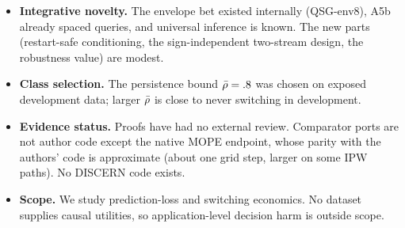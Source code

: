 \begin{itemize}
  inequality. The rate bound holds for the per-step relaxation only; a lower bound for the stationary
  class, which universal inference can beat, is missing.
  \item \textbf{Integrative novelty.} The envelope bet existed internally (QSG-env8), A5b already
  spaced queries, and universal inference is known. The new parts (restart-safe conditioning, the
  sign-independent two-stream design, the robustness value) are modest.
  \item \textbf{Class selection.} The persistence bound $\bar\rho=.8$ was chosen on exposed development
  data; larger $\bar\rho$ is close to never switching in development.
  \item \textbf{Evidence status.} Proofs have had no external review. Comparator ports are not author
  code except the native MOPE endpoint, whose parity with the authors' code is approximate (about one
  grid step, larger on some IPW paths). No DISCERN code exists.
  \item \textbf{Scope.} We study prediction-loss and switching economics. No dataset supplies causal
  utilities, so application-level decision harm is outside scope.
\end{itemize}
